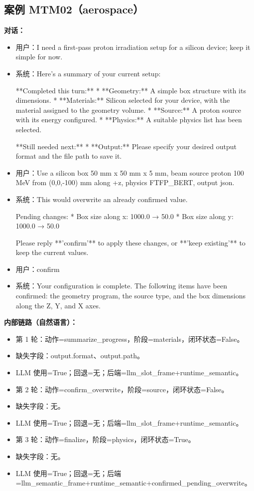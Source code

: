 \documentclass[11pt]{ctexart}
\begin{document}
\subsection{案例 MTM02（aerospace）}
\textbf{对话：}
\begin{itemize}
\item 用户：I need a first-pass proton irradiation setup for a silicon device; keep it simple for now.
\item 系统：Here's a summary of your current setup:

**Completed this turn:**
*   **Geometry:** A simple box structure with its dimensions.
*   **Materials:** Silicon selected for your device, with the material assigned to the geometry volume.
*   **Source:** A proton source with its energy configured.
*   **Physics:** A suitable physics list has been selected.

**Still needed next:**
*   **Output:** Please specify your desired output format and the file path to save it.
\item 用户：Use a silicon box 50 mm x 50 mm x 5 mm, beam source proton 100 MeV from (0,0,-100) mm along +z, physics FTFP\_BERT, output json.
\item 系统：This would overwrite an already confirmed value.

Pending changes:
*   Box size along x: 1000.0 → 50.0
*   Box size along y: 1000.0 → 50.0

Please reply **'confirm'** to apply these changes, or **'keep existing'** to keep the current values.
\item 用户：confirm
\item 系统：Your configuration is complete. The following items have been confirmed: the geometry program, the source type, and the box dimensions along the Z, Y, and X axes.
\end{itemize}
\textbf{内部链路（自然语言）：}
\begin{itemize}
\item 第 1 轮：动作=summarize\_progress，阶段=materials，闭环状态=False。
\item 缺失字段：output.format、output.path。
\item LLM 使用=True；回退=无；后端=llm\_slot\_frame+runtime\_semantic。
\item 第 2 轮：动作=confirm\_overwrite，阶段=source，闭环状态=False。
\item 缺失字段：无。
\item LLM 使用=True；回退=无；后端=llm\_slot\_frame+runtime\_semantic。
\item 第 3 轮：动作=finalize，阶段=physics，闭环状态=True。
\item 缺失字段：无。
\item LLM 使用=True；回退=无；后端=llm\_semantic\_frame+runtime\_semantic+confirmed\_pending\_overwrite。
\end{itemize}
\end{document}
